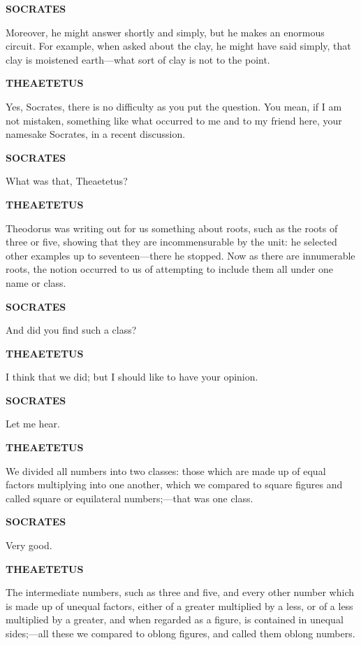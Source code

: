 \documentclass[11pt,letter]{article}
\begin{document}
\par \textbf{SOCRATES}
\par   Moreover, he might answer shortly and simply, but he makes an enormous circuit. For example, when asked about the clay, he might have said simply, that clay is moistened earth—what sort of clay is not to the point.

\par \textbf{THEAETETUS}
\par   Yes, Socrates, there is no difficulty as you put the question. You mean, if I am not mistaken, something like what occurred to me and to my friend here, your namesake Socrates, in a recent discussion.

\par \textbf{SOCRATES}
\par   What was that, Theaetetus?

\par \textbf{THEAETETUS}
\par   Theodorus was writing out for us something about roots, such as the roots of three or five, showing that they are incommensurable by the unit:  he selected other examples up to seventeen—there he stopped. Now as there are innumerable roots, the notion occurred to us of attempting to include them all under one name or class.

\par \textbf{SOCRATES}
\par   And did you find such a class?

\par \textbf{THEAETETUS}
\par   I think that we did; but I should like to have your opinion.

\par \textbf{SOCRATES}
\par   Let me hear.

\par \textbf{THEAETETUS}
\par   We divided all numbers into two classes:  those which are made up of equal factors multiplying into one another, which we compared to square figures and called square or equilateral numbers;—that was one class.

\par \textbf{SOCRATES}
\par   Very good.

\par \textbf{THEAETETUS}
\par   The intermediate numbers, such as three and five, and every other number which is made up of unequal factors, either of a greater multiplied by a less, or of a less multiplied by a greater, and when regarded as a figure, is contained in unequal sides;—all these we compared to oblong figures, and called them oblong numbers.
\end{document}
